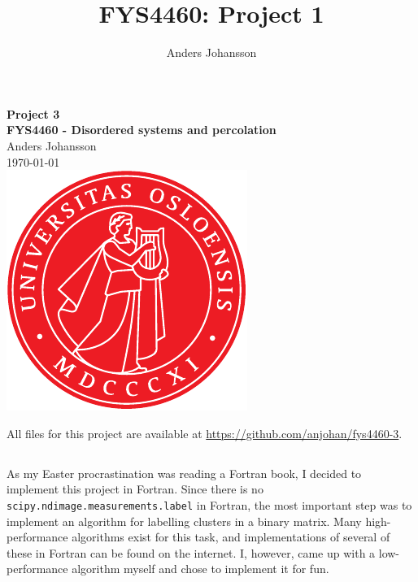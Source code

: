 \documentclass[11pt,british,a4paper]{report}
\begin{document}
\title{FYS4460: Project 1}
\author{Anders Johansson}

\begin{titlepage}
\vspace*{\fill}
\begin{center}
\textsf{
    \Huge \textbf{Project 3}\\\vspace{0.5cm}
    \Large \textbf{FYS4460 - Disordered systems and percolation}\\
    \vspace{8cm}
    Anders Johansson\\
    \today\\
}
\vspace{1.5cm}
\includegraphics{uio.pdf}\\
\vspace*{\fill}
\end{center}
\end{titlepage}
\null
\pagestyle{empty}
\newpage

\pagestyle{fancy}
\setcounter{page}{1}

All files for this project are available at \url{https://github.com/anjohan/fys4460-3}.

%
\subsection{}
As my Easter procrastination was reading a Fortran book\cite{brainerd_guide_2015}, I decided to implement this project in Fortran. Since there is no \lstinline{scipy.ndimage.measurements.label} in Fortran, the most important step was to implement an algorithm for labelling clusters in a binary matrix. Many high-performance algorithms exist for this task, and implementations of several of these in Fortran can be found on the internet. I, however, came up with a low-performance algorithm myself and chose to implement it for fun.
\end{document}
